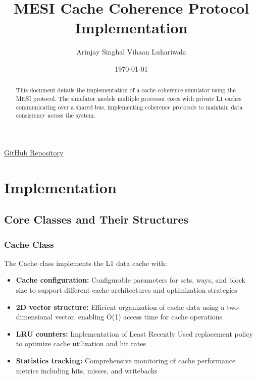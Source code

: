 \documentclass[10pt]{article}
\title{\Large MESI Cache Coherence Protocol Implementation}
\author{Arinjay Singhal \quad Vihaan Luhariwala}
\date{\today}
\begin{document}
\maketitle

\vspace{-0.5cm}
\begin{center}
\href{https://github.com/BluePanther928/COL216_A3}{GitHub Repository}
\end{center}

\begin{abstract}
\small
This document details the implementation of a cache coherence simulator using the MESI protocol. The simulator models multiple processor cores with private L1 caches communicating over a shared bus, implementing coherence protocols to maintain data consistency across the system.
\end{abstract}

\tableofcontents

\clearpage

\section{Implementation}
\subsection{Core Classes and Their Structures}
\subsubsection{Cache Class}
\small
The Cache class implements the L1 data cache with:
\begin{itemize}
    \item \textbf{Cache configuration:} Configurable parameters for sets, ways, and block size to support different cache architectures and optimization strategies
    \item \textbf{2D vector structure:} Efficient organization of cache data using a two-dimensional vector, enabling O(1) access time for cache operations
    \item \textbf{LRU counters:} Implementation of Least Recently Used replacement policy to optimize cache utilization and hit rates
    \item \textbf{Statistics tracking:} Comprehensive monitoring of cache performance metrics including hits, misses, and writebacks
\end{itemize}
\end{document}
